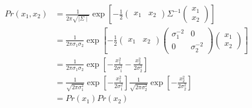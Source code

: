 \documentclass{article}
\begin{document}
\begin{align*}
	Pr\left( x_1,x_2 \right) &= \frac{1}{2\pi \sqrt{\mid \Sigma  \mid} } \exp\left[ -\frac{1}{2} \begin{pmatrix} x_1 & x_2 \end{pmatrix} \Sigma^{-1} \begin{pmatrix} x_1 \\ x_2  \end{pmatrix}     \right]  \\
							 &= \frac{1}{2\pi \sigma_1 \sigma_2} \exp\left[ -\frac{1}{2} \begin{pmatrix} x_1 & x_2 \end{pmatrix} \begin{pmatrix} \sigma_1^{-2} & 0 \\ 0 & \sigma_2^{-2} \end{pmatrix} \begin{pmatrix} x_1 \\ x_2 \end{pmatrix}     \right] \\
						 &= \frac{1}{2\pi \sigma_1 \sigma_2 } \exp\left[ -\frac{x_1^2}{2\sigma_1^2} - \frac{x_2^2}{2\sigma^2_2} \right] \\
						 &= \frac{1}{\sqrt{2\pi \sigma^2_1}} \exp\left[ -\frac{x_1^2}{2\sigma_1^2}  \right] \frac{1}{\sqrt{2\pi \sigma^2_2}} \exp\left[ -\frac{x_2^2}{2\sigma_2^2}  \right] \\
						 &= Pr\left( x_1 \right) Pr\left( x_2 \right) 
\end{align*}
\end{document}
